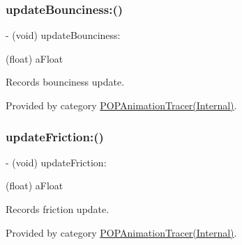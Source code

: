 \mbox{\label{interface_p_o_p_animation_tracer_a61998b16b4eb5df6d11dbd0bd269339c}} 
\subsubsection{\texorpdfstring{update\+Bounciness\+:()}{updateBounciness:()}\hspace{0.1cm}{\footnotesize\ttfamily [2/2]}}
{\footnotesize\ttfamily -\/ (void) update\+Bounciness\+: \begin{DoxyParamCaption}\item[{(float)}]{a\+Float }\end{DoxyParamCaption}}

Records bounciness update. 

Provided by category \mbox{\hyperlink{category_p_o_p_animation_tracer_07_internal_08_a61998b16b4eb5df6d11dbd0bd269339c}{P\+O\+P\+Animation\+Tracer(\+Internal)}}.

\mbox{\label{interface_p_o_p_animation_tracer_aba012bff58a203420d1adf3e922491e0}} 
\subsubsection{\texorpdfstring{update\+Friction\+:()}{updateFriction:()}\hspace{0.1cm}{\footnotesize\ttfamily [1/2]}}
{\footnotesize\ttfamily -\/ (void) update\+Friction\+: \begin{DoxyParamCaption}\item[{(float)}]{a\+Float }\end{DoxyParamCaption}}

Records friction update. 

Provided by category \mbox{\hyperlink{category_p_o_p_animation_tracer_07_internal_08_aba012bff58a203420d1adf3e922491e0}{P\+O\+P\+Animation\+Tracer(\+Internal)}}.

\mbox{\label{interface_p_o_p_animation_tracer_aba012bff58a203420d1adf3e922491e0}} 

